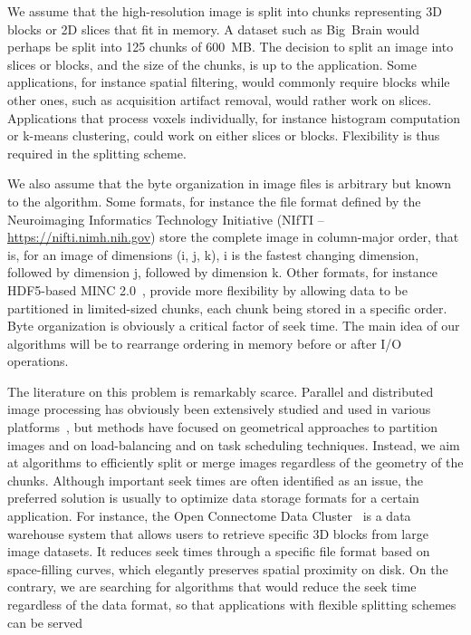 \documentclass[10pt, conference, compsocconf]{IEEEtran}
\begin{document}
We assume that the high-resolution image is split into chunks
representing 3D blocks or 2D slices that fit in memory. A dataset such
as Big~Brain would perhaps be split into 125 chunks of 600~MB. The
decision to split an image into slices or blocks, and the size of the
chunks, is up to the application. Some applications, for instance spatial filtering, would
commonly require blocks while other
ones, such as acquisition artifact removal, would rather work on
slices. Applications that process voxels individually, for instance
histogram computation or k-means clustering, could work on either
slices or blocks. Flexibility is thus required in the splitting
scheme.

We also assume that the byte organization in image files is arbitrary
but known to the algorithm. Some formats, for instance the file format
defined by the Neuroimaging Informatics Technology Initiative (NIfTI
-- \url{https://nifti.nimh.nih.gov}) store the complete image in
column-major order, that is, for an image of dimensions (i, j, k), i
is the fastest changing dimension, followed by dimension j, followed
by dimension k. Other formats, for instance HDF5-based MINC
2.0~\cite{vincent2016minc}, provide more flexibility by allowing data
to be partitioned in limited-sized chunks, each chunk being stored in
a specific order. Byte organization is obviously a critical factor of
seek time. The main idea of our algorithms will be to rearrange
ordering in memory before or after I/O operations.

The literature on this problem is remarkably scarce. Parallel and
distributed image processing has obviously been extensively studied
and used in various
platforms~\cite{miguet1991elastic,tang2007eman2,yang2008parallel,braunl2013parallel,moise2013terabyte,bajcsy2013terabyte},
but methods have focused on geometrical approaches to partition images
and on load-balancing and on task scheduling techniques. Instead, we
aim at algorithms to efficiently split or merge images regardless of
the geometry of the chunks. Although important seek times are often
identified as an issue, the preferred solution is usually to optimize
data storage formats for a certain application.  For instance, the
Open Connectome Data Cluster~\cite{burns2013open} is a data warehouse
system that allows users to retrieve specific 3D blocks from large
image datasets. It reduces seek times through a specific file format
based on space-filling curves, which elegantly preserves spatial
proximity on disk. On the contrary, we are searching for algorithms
that would reduce the seek time regardless of the data format, so that
applications with flexible splitting schemes can be served
\end{document}
